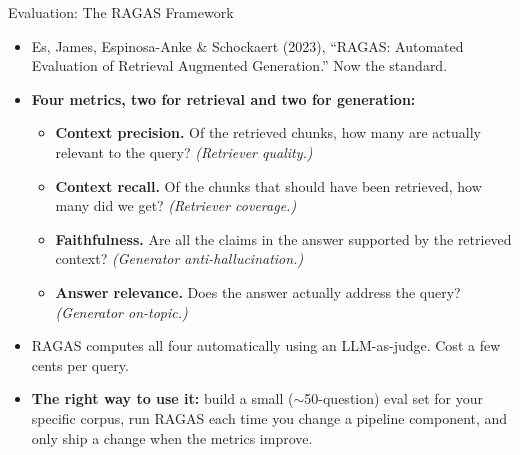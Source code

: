 \begin{frame}{Evaluation: The RAGAS Framework}
\begin{itemize}
\item Es, James, Espinosa-Anke \& Schockaert (2023), ``RAGAS: Automated Evaluation of Retrieval Augmented Generation.'' Now the standard.

\medskip
\item \textbf{Four metrics, two for retrieval and two for generation:}
\begin{itemize}
    \item \textbf{Context precision.} Of the retrieved chunks, how many are actually relevant to the query? \emph{(Retriever quality.)}
    \medskip
    \item \textbf{Context recall.} Of the chunks that should have been retrieved, how many did we get? \emph{(Retriever coverage.)}
    \medskip
    \item \textbf{Faithfulness.} Are all the claims in the answer supported by the retrieved context? \emph{(Generator anti-hallucination.)}
    \medskip
    \item \textbf{Answer relevance.} Does the answer actually address the query? \emph{(Generator on-topic.)}
\end{itemize}

\medskip
\item RAGAS computes all four automatically using an LLM-as-judge. Cost a few cents per query.

\medskip
\item \textbf{The right way to use it:} build a small ($\sim$50-question) eval set for your specific corpus, run RAGAS each time you change a pipeline component, and only ship a change when the metrics improve.
\end{itemize}
\end{frame}

